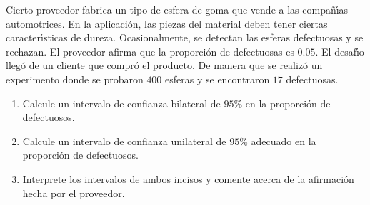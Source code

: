 \begin{enunciado}
 Cierto proveedor fabrica un tipo de esfera de goma que vende a las compa\~n\'{\i}as automotrices. En la aplicaci\'on, las piezas del material deben tener ciertas caracter\'{\i}sticas de dureza. Ocasionalmente, se detectan las esferas defectuosas y se rechazan. El proveedor afirma que la proporci\'on de defectuosas es $0.05$. El desaf\'{\i}o lleg\'o de un cliente que compr\'o el producto. De manera que se realiz\'o un experimento donde se probaron $400$ esferas y se encontraron $17$ defectuosas.
 \begin{enumerate}
  \item Calcule un intervalo de confianza bilateral de $95\%$ en la proporci\'on de defectuosos.
  
  \item Calcule un intervalo de confianza unilateral de $95\%$ adecuado en la proporci\'on de defectuosos.
  
  \item Interprete los intervalos de ambos incisos y comente acerca de la afirmaci\'on hecha por el proveedor.
 \end{enumerate}
\end{enunciado}

